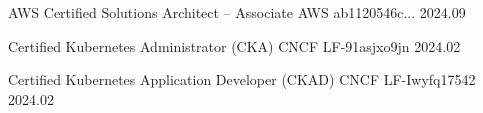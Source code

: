 

\begin{cvhonors}

  \cvhonor
    {AWS Certified Solutions Architect – Associate} %
    {AWS} %
    {ab1120546c...} %
    {2024.09} %

  \cvhonor
    {Certified Kubernetes Administrator (CKA)} %
    {CNCF} %
    {LF-91asjxo9jn} %
    {2024.02} %

  \cvhonor
    {Certified Kubernetes Application Developer (CKAD)} %
    {CNCF} %
    {LF-Iwyfq17542} %
    {2024.02} %

\end{cvhonors}
